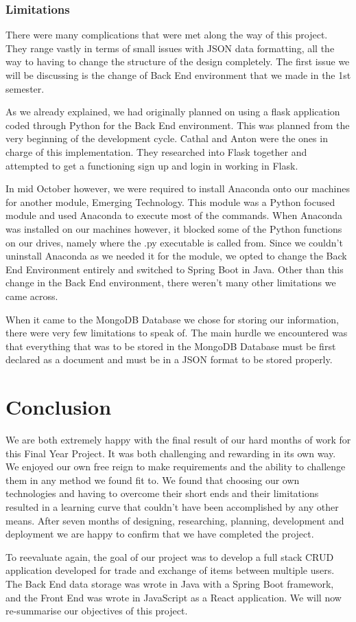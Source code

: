 \subsection{Limitations}
There were many complications that were met along the way of this project. They range vastly in terms of small issues with JSON data formatting, all the way to having to change the structure of the design completely. The first issue we will be discussing is the change of Back End environment that we made in the 1st semester. \par
As we already explained, we had originally planned on using a flask application coded through Python for the Back End environment. This was planned from the very beginning of the development cycle. Cathal and Anton were the ones in charge of this implementation. They researched into Flask together and attempted to get a functioning sign up and login in working in Flask. \par
In mid October however, we were required to install Anaconda onto our machines for another module, Emerging Technology. This module was a Python focused module and used Anaconda to execute most of the commands. When Anaconda was installed on our machines however, it blocked some of the Python functions on our drives, namely where the .py executable is called from. Since we couldn't uninstall Anaconda as we needed it for the module, we opted to change the Back End Environment entirely and switched to Spring Boot in Java. Other than this change in the Back End environment, there weren't many other limitations we came across. \par
When it came to the MongoDB Database we chose for storing our information, there were very few limitations to speak of. The main hurdle we encountered was that everything that was to be stored in the MongoDB Database must be first declared as a document and must be in a JSON format to be stored properly.
\chapter{Conclusion}
We are both extremely happy with the final result of our hard months of work for this Final Year Project. It was both challenging and rewarding in its own way. We enjoyed our own free reign to make requirements and the ability to challenge them in any method we found fit to. We found that choosing our own technologies and having to overcome their short ends and their limitations resulted in a learning curve that couldn't have been accomplished by any other means. After seven months of designing, researching, planning, development and deployment we are happy to confirm that we have completed the project. \par
To reevaluate again, the goal of our project was to develop a full stack CRUD application developed for trade and exchange of items between multiple users. The Back End data storage was wrote in Java with a Spring Boot framework, and the Front End was wrote in JavaScript as a React application. We will now re-summarise our objectives of this project. \par
